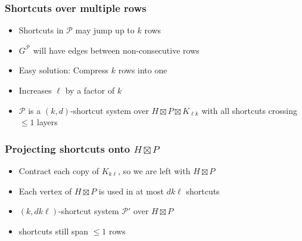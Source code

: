 \documentclass[xcolor=dvipsnames]{beamer}
\begin{document}
\begin{frame}
  \frametitle{Shortcuts over multiple rows}

  \begin{itemize}
    \item Shortcuts in $\mathcal{P}$ may jump up to $k$ rows
    \item $G^\mathcal{P}$ will have edges between non-consecutive rows
    \item<2-> Easy solution: Compress $k$ rows into one
  \end{itemize}
    \begin{center}
    \end{center}
  \begin{itemize}
    \item<3-> Increases $\ell$ by a factor of $k$
    \item<4-> $\mathcal{P}$ is a $(k,d)$-shortcut system over $H\boxtimes P\boxtimes K_{\ell k}$ with all shortcuts crossing $\le\!\! 1$ layers
  \end{itemize}
\end{frame}

\begin{frame}
  \frametitle{Projecting shortcuts onto $H\boxtimes P$}

  \begin{itemize}
    \item<2-> Contract each copy of $K_{k\ell}$, so we are left with $H\boxtimes P$
  \end{itemize}
    \begin{center}
    \end{center}
  \begin{itemize}
    \item<3-> Each vertex of $H\boxtimes P$ is used in at most $dk\ell$ shortcuts
    \item<4-> $(k,dk\ell)$-shortcut system $\mathcal{P'}$ over $H\boxtimes P$
    \item<4-> shortcuts still span $\le\!\!1$ rows
  \end{itemize}
\end{frame}
\end{document}
